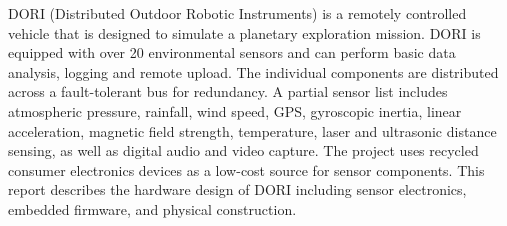 
%
%

\textsc{DORI} (Distributed Outdoor Robotic Instruments) is a remotely controlled vehicle that is designed to simulate a planetary exploration mission. \textsc{DORI} is equipped with over 20 environmental sensors and can perform basic data analysis, logging and remote upload. The individual components are distributed across a fault-tolerant bus for redundancy. A partial sensor list includes atmospheric pressure, rainfall, wind speed, GPS, gyroscopic inertia, linear acceleration, magnetic field strength, temperature, laser and ultrasonic distance sensing, as well as digital audio and video capture. The project uses recycled consumer electronics devices as a low-cost source for sensor components. This report describes the hardware design of DORI including sensor electronics, embedded firmware, and physical construction.











